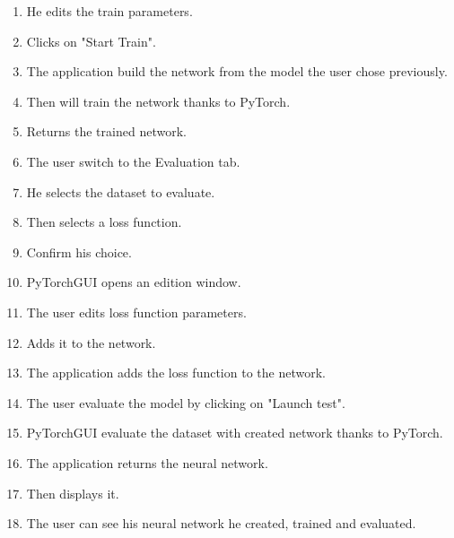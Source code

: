 \begin{enumerate}
        \item He edits the train parameters.
        \item Clicks on "Start Train".
        \item The application build the network from the model the user chose previously.
        \item Then will train the network thanks to PyTorch.
        \item Returns the trained network.
        \item The user switch to the Evaluation tab.
        \item He selects the dataset to evaluate.
        \item Then selects a loss function.
        \item Confirm his choice.
        \item PyTorchGUI opens an edition window.
        \item The user edits loss function parameters.
        \item Adds it to the network.
        \item The application adds the loss function to the network.
        \item The user evaluate the model by clicking on "Launch test".
        \item PyTorchGUI evaluate the dataset with created network thanks to PyTorch.
        \item The application returns the neural network.
        \item Then displays it.
        \item The user can see his neural network he created, trained and evaluated.
    \end{enumerate}
        
    
    

